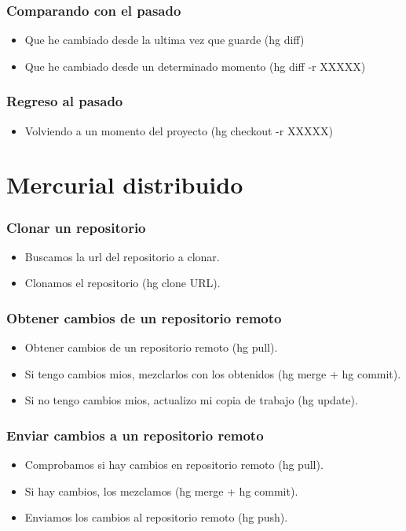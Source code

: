 \documentclass[10pt]{beamer}
\begin{document}
  \begin{frame}[containsverbatim]
    \frametitle{Comparando con el pasado}
    \begin{itemize}
        \item Que he cambiado desde la ultima vez que guarde (hg diff)
        \item Que he cambiado desde un determinado momento (hg diff -r XXXXX)
    \end{itemize}
  \end{frame}

  \begin{frame}[containsverbatim]
    \frametitle{Regreso al pasado}
    \begin{itemize}
        \item Volviendo a un momento del proyecto (hg checkout -r XXXXX)
    \end{itemize}
  \end{frame}

  \section*{Mercurial distribuido}

  \begin{frame}[containsverbatim]
    \frametitle{Clonar un repositorio}
    \begin{itemize}
      \item Buscamos la url del repositorio a clonar.
      \item Clonamos el repositorio (hg clone URL).
    \end{itemize}
  \end{frame}

  \begin{frame}[containsverbatim]
    \frametitle{Obtener cambios de un repositorio remoto}
    \begin{itemize}
      \item Obtener cambios de un repositorio remoto (hg pull).
      \item Si tengo cambios mios, mezclarlos con los obtenidos (hg merge + hg commit).
      \item Si no tengo cambios mios, actualizo mi copia de trabajo (hg update).
    \end{itemize}
  \end{frame}

  \begin{frame}[containsverbatim]
    \frametitle{Enviar cambios a un repositorio remoto}
    \begin{itemize}
      \item Comprobamos si hay cambios en repositorio remoto (hg pull).
      \item Si hay cambios, los mezclamos (hg merge + hg commit).
      \item Enviamos los cambios al repositorio remoto (hg push).
    \end{itemize}
  \end{frame}
\end{document}
